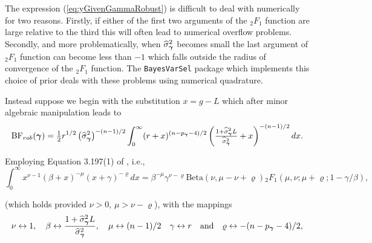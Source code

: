 The expression (\ref{eq:yGivenGammaRobust}) is difficult to deal with
numerically for two reasons. Firstly, if either of the first two arguments of
the ${}_2F_1$ function are large relative to the third this will often lead to
numerical overflow problems. Secondly, and more problematically, when
$\widehat{\sigma}_{\boldsymbol \gamma}^2$ becomes small the last argument of ${}_2F_1$
function can become less than $-1$ which falls outside the radius of
convergence of the ${}_2F_1$ function. The {\tt BayesVarSel} package which
implements this choice of prior deals with these problems using numerical
quadrature.

Instead suppose we begin with the substitution $x = g - L$ which after minor
algebraic manipulation leads to
$$
\displaystyle \mbox{BF}_{{rob}}({\boldsymbol \gamma})
= \tfrac{1}{2} r^{1/2} \left( \widehat{\sigma}_{\boldsymbol \gamma}^2\right)^{-(n-1)/2} 
\int_0^\infty  (r + x)^{(n - p_{\boldsymbol \gamma}-4)/2}
\left(  \tfrac{1 +  \widehat{\sigma}_{\boldsymbol \gamma}^2L}{\widehat{\sigma}_{\boldsymbol \gamma}^2} +  x \right)^{-(n-1)/2} dx.
$$

\noindent Employing Equation 3.197(1) of \cite{Gradshteyn2007}, i.e.,
$$
\int_0^\infty x^{\nu - 1}(\beta + x)^{-\mu}(x + \gamma)^{-\varrho} dx
= \beta^{-\mu}
\gamma^{\nu - \varrho} 
\mbox{Beta}(\nu,\mu - \nu + \varrho)
{}_2F_1(\mu,\nu;\mu+\varrho; 1 - \gamma/\beta),
$$

\noindent (which holds provided $\nu>0$, $\mu > \nu - \varrho$), with the
mappings
$$
\nu \leftrightarrow 1,
\quad 
\beta \leftrightarrow \frac{1 +  \widehat{\sigma}_{\boldsymbol \gamma}^2L}{\widehat{\sigma}_{\boldsymbol \gamma}^2},
\quad 
\mu \leftrightarrow (n-1)/2
\quad 
\gamma \leftrightarrow r
\quad \mbox{and} \quad 
\varrho \leftrightarrow -(n - p_{\boldsymbol \gamma}-4)/2,
$$


